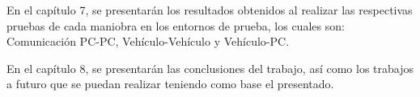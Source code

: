 \par En el capítulo 7, se presentarán los resultados obtenidos al realizar las respectivas pruebas de cada maniobra en los entornos de prueba, los cuales son: Comunicación PC-PC, Vehículo-Vehículo y Vehículo-PC.\\

\par En el capítulo 8, se presentarán las conclusiones del trabajo, así como los trabajos a futuro que se puedan realizar teniendo como base el presentado.     
